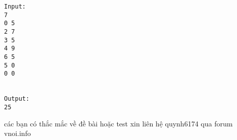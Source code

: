 \begin{verbatim}
Input:
7
0 5
2 7
3 5
4 9
6 5
5 0
0 0


Output:
25
\end{verbatim}

các bạn có thắc mắc về đề bài hoặc test xin liên hệ quynh6174 qua forum vnoi.info